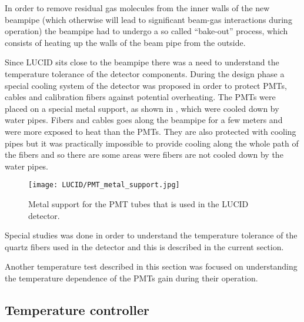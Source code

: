 In order to remove residual gas molecules from the inner walls of the new beampipe (which otherwise will lead to significant beam-gas interactions during operation)
the beampipe had to undergo a so called ``bake-out'' process, which consists of heating up the walls of the beam pipe from the outside.

Since LUCID sits close to the beampipe there was a need to understand the temperature tolerance of the detector components.
During the design phase a special cooling system of the detector was proposed in order to protect PMTs, cables and calibration fibers against potential overheating.
The PMTs were placed on a special metal support, as shown in , which were cooled down by water pipes.
Fibers and cables goes along the beampipe for a few meters and were more exposed to heat than the PMTs.
They are also protected with cooling pipes but it was practically impossible to provide cooling along the whole path of the fibers 
and so there are some areas were fibers are not cooled down by the water pipes.

\begin{figure}
\centering
\texttt{[image: LUCID/PMT\_metal\_support.jpg]}
\caption{Metal support for the PMT tubes that is used in the LUCID detector.}
\label{fig:metalSupport}
\end{figure}

Special studies was done in order to understand the temperature tolerance of the quartz fibers used in the detector and this is described in the current section.


Another temperature test described in this section was focused on understanding the temperature dependence of the PMTs gain during their operation.

\subsection{Temperature controller}
\label{subsec:tempController}

